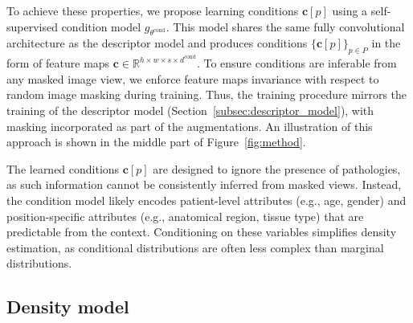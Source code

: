 To achieve these properties, we propose learning conditions \(\mathbf{c}[p]\) using a self-supervised condition model \(g_{\theta^{\text{cond}}}\). This model shares the same fully convolutional architecture as the descriptor model and produces conditions \(\{\mathbf{c}[p]\}_{p \in P}\) in the form of feature maps \(\mathbf{c} \in \mathbb{R}^{h \times w \times s \times d^{\text{cond}}}\). To ensure conditions are inferable from any masked image view, we enforce feature maps invariance with respect to random image masking during training. Thus, the training procedure mirrors the training of the descriptor model (Section~\ref{subsec:descriptor_model}), with masking incorporated as part of the augmentations. An illustration of this approach is shown in the middle part of Figure~\ref{fig:method}.

The learned conditions \(\mathbf{c}[p]\) are designed to ignore the presence of pathologies, as such information cannot be consistently inferred from masked views. Instead, the condition model likely encodes patient-level attributes (e.g., age, gender) and position-specific attributes (e.g., anatomical region, tissue type) that are predictable from the context. Conditioning on these variables simplifies density estimation, as conditional distributions are often less complex than marginal distributions.

\subsection{Density model}
\label{subsec:density_models}


